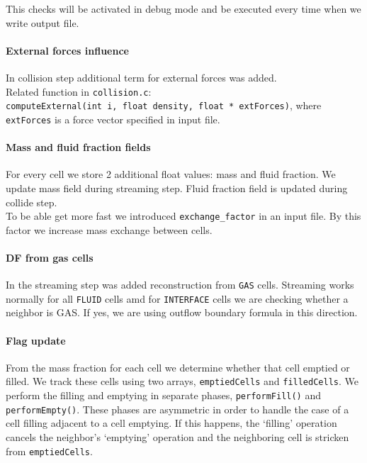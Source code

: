 \documentclass{article}
\begin{document}
This checks will be activated in debug mode and be executed every time
when we write output file.

\paragraph{External forces influence}\label{external-forces-influence}

In collision step additional term for external forces was added.\\
Related function in \texttt{collision.c}:
\texttt{computeExternal(int\ i,\ float\ density,\ float\ *\ extForces)},
where \texttt{extForces} is a force vector specified in input file.

\paragraph{Mass and fluid fraction
fields}\label{mass-and-fluid-fraction-fields}

For every cell we store 2 additional float values: mass and fluid
fraction. We update mass field during streaming step. Fluid fraction
field is updated during collide step.\\
To be able get more fast we introduced \texttt{exchange\_factor} in an
input file. By this factor we increase mass exchange between cells.

\paragraph{DF from gas cells}\label{df-from-gas-cells}

In the streaming step was added reconstruction from \texttt{GAS} cells.
Streaming works normally for all \texttt{FLUID} cells amd for
\texttt{INTERFACE} cells we are checking whether a neighbor is GAS. If
yes, we are using outflow boundary formula in this direction.

\paragraph{Flag update}\label{flag-update}

From the mass fraction for each cell we determine whether that cell
emptied or filled. We track these cells using two arrays,
\texttt{emptiedCells} and \texttt{filledCells}. We perform the filling
and emptying in separate phases, \texttt{performFill()} and
\texttt{performEmpty()}. These phases are asymmetric in order to handle
the case of a cell filling adjacent to a cell emptying. If this happens,
the `filling' operation cancels the neighbor's `emptying' operation and
the neighboring cell is stricken from \texttt{emptiedCells}.
\end{document}
